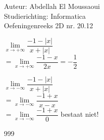 \documentclass[a4paper]{article}
\begin{document}
  
\noindent \large Auteur: Abdellah El Moussaoui \\
\noindent \large Studierichting: Informatica\\
\noindent \large Oefeningenreeks 2D nr. 20.12\\

\medskip

\normalsize

$\lim\limits_{x \rightarrow +\infty} \dfrac{-1 - \left| x \right|}{x + \left| x \right|}$\\

$ = \lim\limits_{x \rightarrow +\infty} \dfrac{-1 - x}{2x} = -\dfrac{1}{2}$\\

\medskip

$\lim\limits_{x \rightarrow -\infty} \dfrac{-1 - \left| x \right|}{x + \left| x \right|}$\\

$ = \lim\limits_{x \rightarrow -\infty} \dfrac{-1 + x}{x - x} $\\

$ = \lim\limits_{x \rightarrow -\infty} \dfrac{-1 + x}{0}$
 bestaat niet!


\begin{thebibliography}{999}
\end{thebibliography}
\end{document}

